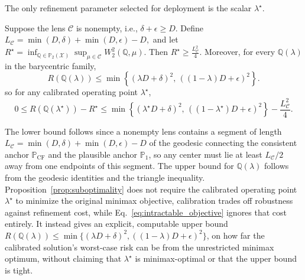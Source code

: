 The only refinement parameter selected for deployment is the scalar $\lambda^\star$.
\fi
\begin{proposition}
\label{prop:suboptimality}
Suppose the lens $\mathcal C$ is nonempty, i.e.,
$\delta+\epsilon\ge D$.
Define
$
L_{\mathcal C}
=
\min(D,\delta)+\min(D,\epsilon)-D,
$
and let
$
R^\star
=
\inf_{\mathbb Q\in\mathbb P_2(\mathcal X)}
\sup_{\mu\in\mathcal C}
W_2^2(\mathbb Q,\mu).
$
Then
$
R^\star
\ge
\frac{L_{\mathcal C}^2}{4}.
$
Moreover, for every $\mathbb Q(\lambda)$ in the barycentric
family,
\[
R(\mathbb Q(\lambda))
\le
\min\left\{
(\lambda D+\delta)^2,\,
((1-\lambda)D+\epsilon)^2
\right\}.
\]
so for any calibrated operating point $\lambda^\star$,
\[
0
\le
R(\mathbb Q(\lambda^\star))-R^\star
\le
\min\left\{
(\lambda^\star D+\delta)^2,\,
((1-\lambda^\star)D+\epsilon)^2
\right\}
-
\frac{L_{\mathcal C}^2}{4}.
\]
\end{proposition}

The lower bound follows since a nonempty lens contains a segment of length $L_{\mathcal C}=\min(D,\delta)+\min(D,\epsilon)-D$ of the geodesic connecting the \textcolor{frappe_red}{consistent} anchor
$\mathbb{P}_{\mathrm{CF}}$ and the plausible anchor $\mathbb{P}_1$, so any center must lie at least $L_{\mathcal C}/2$ away from one endpoints of this segment. The upper bound for $\mathbb Q(\lambda)$ follows from the geodesic identities and the triangle inequality. 
Proposition~\ref{prop:suboptimality} does not require the calibrated operating point $\lambda^\star$ to minimize the original minimax objective, calibration trades off robustness against refinement cost, while Eq.~\ref{eq:intractable_objective} ignores that cost entirely.
It instead gives an explicit, computable upper
bound
$R(\mathbb Q(\lambda))
\le
\min\{(\lambda D+\delta)^2,
((1-\lambda)D+\epsilon)^2\}$, on how far the calibrated solution's worst-case risk can be from the unrestricted minimax optimum, without claiming that $\lambda^\star$ is minimax-optimal or that the upper bound is tight.
\fi

